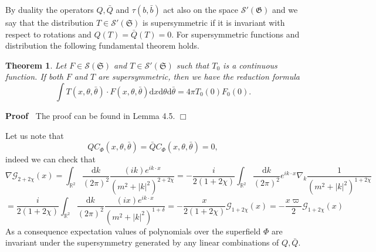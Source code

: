 \documentclass[a4paper,10pt]{article}
\newcommand{\mathd}{\mathrm{d}}
\newenvironment{proof}{\noindent\textbf{Proof\ }}{\hspace*{\fill}$\Box$\medskip}
\newtheorem{theorem}{Theorem}
\begin{document}
By duality the operators $Q, \bar{Q}$ and $\tau (b, \bar{b})$ act also on the
space $\mathcal{S}' (\mathfrak{G})$ and we say that the distribution $T \in
\mathcal{S}' (\mathfrak{S})$ is supersymmetric if it is invariant with respect
to rotations and $Q (T) = \bar{Q} (T) = 0$. For supersymmetric functions and
distribution the following fundamental theorem holds.

\begin{theorem}
  \label{theorem_supersymmetry1}Let $F \in \mathcal{S} (\mathfrak{S})$ and $T
  \in \mathcal{S}' (\mathfrak{S})$ such that $T_0$ is a continuous function.
  If both $F$ and $T$ are supersymmetric, then we have the reduction formula
  \begin{equation}
    \int T (x, \theta, \bar{\theta}) \cdot F (x, \theta, \bar{\theta}) \mathd
    x \mathd \theta \mathd \bar{\theta} = 4 \pi T_0 (0) F_0 (0) .
    \label{eq:key}
  \end{equation}
\end{theorem}

\begin{proof}
  The proof can be found in {\cite{Klein1984}} Lemma 4.5.
\end{proof}

Let us note that
\[ Q C_{\Phi} (x, \theta, \bar{\theta}) = \bar{Q} C_{\Phi} (x, \theta,
   \bar{\theta}) = 0, \]
indeed we can check that
\[ \nabla \mathcal{G}_{2 + 2 \chi} (x) = \int_{\mathbb{R}^2} \frac{\mathd
   k}{(2 \pi)^2}  \frac{(i k) e^{i k \cdot x}}{(m^2 + | k |^2)^{2 + 2 \chi}} =
   - \frac{i}{2 (1 + 2 \chi)} \int_{\mathbb{R}^2} \frac{\mathd k}{(2 \pi)^2}
   e^{i k \cdot x} \nabla_k  \frac{1}{(m^2 + | k |^2)^{1 + 2 \chi}} \]
\[ = \frac{i}{2 (1 + 2 \chi)} \int_{\mathbb{R}^2} \frac{\mathd k}{(2 \pi)^2} 
   \frac{(i x) e^{i k \cdot x}}{(m^2 + | k |^2)^{1 + \delta}} = - \frac{x}{2
   (1 + 2 \chi)} \mathcal{G}_{1 + 2 \chi} (x) = - \frac{x \varpi}{2}
   \mathcal{G}_{1 + 2 \chi} (x) \]
As a consequence expectation values of polynomials over the superfield $\Phi$
are invariant under the supersymmetry generated by any linear combinations of
$Q, \bar{Q}$.
\end{document}
